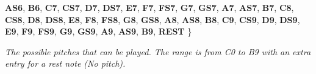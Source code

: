 \begin{DoxyCompactItemize}
{\bfseries A\+S6}, 
{\bfseries B6}, 
\newline
{\bfseries C7}, 
{\bfseries C\+S7}, 
{\bfseries D7}, 
{\bfseries D\+S7}, 
\newline
{\bfseries E7}, 
{\bfseries F7}, 
{\bfseries F\+S7}, 
{\bfseries G7}, 
\newline
{\bfseries G\+S7}, 
{\bfseries A7}, 
{\bfseries A\+S7}, 
{\bfseries B7}, 
\newline
{\bfseries C8}, 
{\bfseries C\+S8}, 
{\bfseries D8}, 
{\bfseries D\+S8}, 
\newline
{\bfseries E8}, 
{\bfseries F8}, 
{\bfseries F\+S8}, 
{\bfseries G8}, 
\newline
{\bfseries G\+S8}, 
{\bfseries A8}, 
{\bfseries A\+S8}, 
{\bfseries B8}, 
\newline
{\bfseries C9}, 
{\bfseries C\+S9}, 
{\bfseries D9}, 
{\bfseries D\+S9}, 
\newline
{\bfseries E9}, 
{\bfseries F9}, 
{\bfseries F\+S9}, 
{\bfseries G9}, 
\newline
{\bfseries G\+S9}, 
{\bfseries A9}, 
{\bfseries A\+S9}, 
{\bfseries B9}, 
\newline
{\bfseries R\+E\+ST}
 \}\begin{DoxyCompactList}\small\item\em The possible pitches that can be played. The range is from C0 to B9 with an extra entry for a rest note (No pitch). \end{DoxyCompactList}
\end{DoxyCompactItemize}


